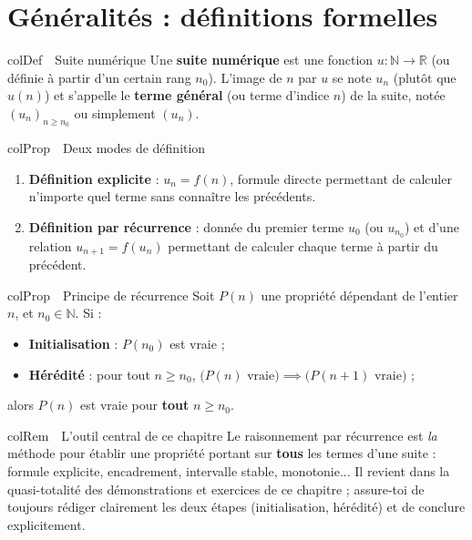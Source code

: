 \documentclass[11pt,a4paper]{article}
\newenvironment{definition}[1][Définition]
  {\begin{fiche}{colDef}{\ding{110}~~#1}}{\end{fiche}}
\newenvironment{propriete}[1][Propriété]
  {\begin{fiche}{colProp}{\ding{72}~~#1}}{\end{fiche}}
\newenvironment{remarque}[1][Remarque]
  {\begin{fiche}{colRem}{\ding{43}~~#1}}{\end{fiche}}
\begin{document}
\vspace{4mm}

\section{Généralités : définitions formelles}

\begin{definition}[Suite numérique]
Une \textbf{suite numérique} est une fonction $u : \mathbb{N} \to \mathbb{R}$ (ou définie à partir d'un certain rang $n_0$). L'image de $n$ par $u$ se note $u_n$ (plutôt que $u(n)$) et s'appelle le \textbf{terme général} (ou terme d'indice $n$) de la suite, notée $(u_n)_{n \geq n_0}$ ou simplement $(u_n)$.
\end{definition}

\begin{propriete}[Deux modes de définition]
\begin{enumerate}[leftmargin=7mm, itemsep=0.5mm]
  \item \textbf{Définition explicite} : $u_n = f(n)$, formule directe permettant de calculer n'importe quel terme sans connaître les précédents.
  \item \textbf{Définition par récurrence} : donnée du premier terme $u_0$ (ou $u_{n_0}$) et d'une relation $u_{n+1} = f(u_n)$ permettant de calculer chaque terme à partir du précédent.
\end{enumerate}
\end{propriete}

\begin{propriete}[Principe de récurrence]
Soit $P(n)$ une propriété dépendant de l'entier $n$, et $n_0\in\mathbb{N}$. Si :
\begin{itemize}[leftmargin=6mm, itemsep=0.5mm]
  \item \textbf{Initialisation} : $P(n_0)$ est vraie ;
  \item \textbf{Hérédité} : pour tout $n\geq n_0$, $\bigl(P(n) \text{ vraie}\bigr) \implies \bigl(P(n+1) \text{ vraie}\bigr)$ ;
\end{itemize}
alors $P(n)$ est vraie pour \textbf{tout} $n\geq n_0$.
\end{propriete}

\begin{remarque}[L'outil central de ce chapitre]
Le raisonnement par récurrence est \emph{la} méthode pour établir une propriété portant sur \textbf{tous} les termes d'une suite : formule explicite, encadrement, intervalle stable, monotonie... Il revient dans la quasi-totalité des démonstrations et exercices de ce chapitre ; assure-toi de toujours rédiger clairement les deux étapes (initialisation, hérédité) et de conclure explicitement.
\end{remarque}
\end{document}
